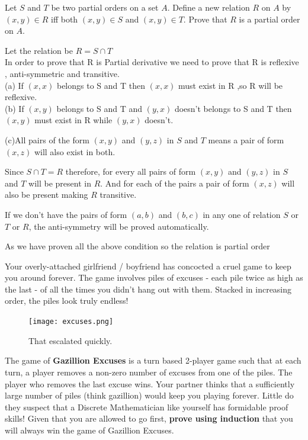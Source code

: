 \documentclass[addpoints]{exam}
\begin{document}
\begin{questions}
\question
     Let $S$ and $T$ be two partial orders on a set $A$. Define a new relation $R$ on $A$ by $(x,y)\in R$ iff both $(x,y) \in S$ and $(x,y) \in T$. Prove that $R$ is a partial order on $A$.

    \begin{solution}
    Let the relation be $R = S 
   \cap T$ \\
   In order to prove that R is Partial derivative we need to prove that R is reflexive , anti-symmetric and transitive.\\
   (a) If $(x,x)$ belongs to S and T then $(x,x)$ must exist in R ,so R will be reflexive.\\
   (b) If $(x,y)$ belongs to S and T and $(y,x)$ doesn't belongs to S and T then $(x,y)$ must exist in R while $(y,x)$ doesn't.
    
    (c)All pairs of the form $(x,y)$ and $(y,z)$ in $S$ and $T$ means a pair of form $(x,z)$ will also exist in both.
     
     Since $S \cap T = R$ therefore, for every all pairs of form  $(x,y)$ and $(y,z)$ in $S$ and $T$ will be present in $R$. And for each of the pairs a pair of form $(x,z)$ will also be present making $R$ transitive.
     
      If we don't have the pairs of form $(a, b)$ and $(b,c)$ in any one of relation $S$ or $T$ or $R$, the anti-symmetry will be proved automatically.
      
    As we have proven all the above condition so the relation is partial order 
   \end{solution}

\question Your overly-attached girlfriend / boyfriend has concocted a cruel game to keep you around forever. The game involves piles of excuses - each pile twice as high as the last - of all the times you didn't hang out with them. Stacked in increasing order, the piles look truly endless! 

\begin{figure}[ht]
  \centering
  \texttt{[image: excuses.png]}
  \caption{That escalated quickly.}
  \label{fig:Piles of excuses}
\end{figure}

The game of \textbf{Gazillion Excuses} is a turn based 2-player game such that at each turn, a player removes a non-zero number of excuses from one of the piles. The player who removes the last excuse wins. Your partner thinks that a sufficiently large number of piles (think gazillion) would keep you playing forever. Little do they suspect that a Discrete Mathematician like yourself has formidable proof skills! Given that you are allowed to go first, \textbf{prove using induction} that you will always win the game of Gazillion Excuses. 


\end{questions}
\end{document}
